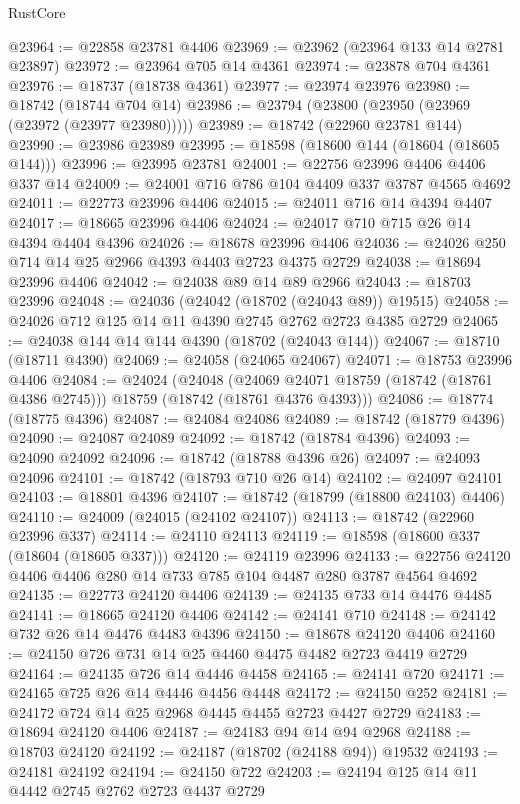 \begin{lexlean}{RustCore}
\begin{coremodule}
@23964 := @22858 @23781 @4406
@23969 := @23962 (@23964 @133 @14 @2781 @23897)
@23972 := @23964 @705 @14 @4361
@23974 := @23878 @704 @4361
@23976 := @18737 (@18738 @4361)
@23977 := @23974 @23976
@23980 := @18742 (@18744 @704 @14)
@23986 := @23794 (@23800 (@23950 (@23969 (@23972 (@23977 @23980)))))
@23989 := @18742 (@22960 @23781 @144)
@23990 := @23986 @23989
@23995 := @18598 (@18600 @144 (@18604 (@18605 @144)))
@23996 := @23995 @23781
@24001 := @22756 @23996 @4406 @4406 @337 @14
@24009 := @24001 @716 @786 @104 @4409 @337 @3787 @4565 @4692
@24011 := @22773 @23996 @4406
@24015 := @24011 @716 @14 @4394 @4407
@24017 := @18665 @23996 @4406
@24024 := @24017 @710 @715 @26 @14 @4394 @4404 @4396
@24026 := @18678 @23996 @4406
@24036 := @24026 @250 @714 @14 @25 @2966 @4393 @4403 @2723 @4375 @2729
@24038 := @18694 @23996 @4406
@24042 := @24038 @89 @14 @89 @2966
@24043 := @18703 @23996
@24048 := @24036 (@24042 (@18702 (@24043 @89)) @19515)
@24058 := @24026 @712 @125 @14 @11 @4390 @2745 @2762 @2723 @4385 @2729
@24065 := @24038 @144 @14 @144 @4390 (@18702 (@24043 @144))
@24067 := @18710 (@18711 @4390)
@24069 := @24058 (@24065 @24067)
@24071 := @18753 @23996 @4406
@24084 := @24024
    (@24048
      (@24069 @24071 @18759 (@18742 (@18761 @4386 @2745)))
      @18759
      (@18742 (@18761 @4376 @4393)))
@24086 := @18774 (@18775 @4396)
@24087 := @24084 @24086
@24089 := @18742 (@18779 @4396)
@24090 := @24087 @24089
@24092 := @18742 (@18784 @4396)
@24093 := @24090 @24092
@24096 := @18742 (@18788 @4396 @26)
@24097 := @24093 @24096
@24101 := @18742 (@18793 @710 @26 @14)
@24102 := @24097 @24101
@24103 := @18801 @4396
@24107 := @18742 (@18799 (@18800 @24103) @4406)
@24110 := @24009 (@24015 (@24102 @24107))
@24113 := @18742 (@22960 @23996 @337)
@24114 := @24110 @24113
@24119 := @18598 (@18600 @337 (@18604 (@18605 @337)))
@24120 := @24119 @23996
@24133 := @22756 @24120 @4406 @4406 @280 @14 @733 @785 @104 @4487 @280 @3787 @4564 @4692
@24135 := @22773 @24120 @4406
@24139 := @24135 @733 @14 @4476 @4485
@24141 := @18665 @24120 @4406
@24142 := @24141 @710
@24148 := @24142 @732 @26 @14 @4476 @4483 @4396
@24150 := @18678 @24120 @4406
@24160 := @24150 @726 @731 @14 @25 @4460 @4475 @4482 @2723 @4419 @2729
@24164 := @24135 @726 @14 @4446 @4458
@24165 := @24141 @720
@24171 := @24165 @725 @26 @14 @4446 @4456 @4448
@24172 := @24150 @252
@24181 := @24172 @724 @14 @25 @2968 @4445 @4455 @2723 @4427 @2729
@24183 := @18694 @24120 @4406
@24187 := @24183 @94 @14 @94 @2968
@24188 := @18703 @24120
@24192 := @24187 (@18702 (@24188 @94)) @19532
@24193 := @24181 @24192
@24194 := @24150 @722
@24203 := @24194 @125 @14 @11 @4442 @2745 @2762 @2723 @4437 @2729

\end{coremodule}
\end{lexlean}
